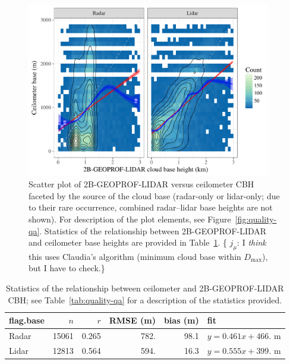 \documentclass[essd,manuscript]{copernicus}\usepackage[]{graphicx}\usepackage[]{color}
\newcommand{\hlnum}[1]{\textcolor[rgb]{0.686,0.059,0.569}{#1}}%
\newenvironment{knitrout}{}{} %
\newcommand\comment[2]{\{\hlnum{ \textit{#1}: #2}\}}
\newcommand\commentjm[1]{\comment{$j_\mu$}{#1}}
\begin{document}
\begin{figure}
  \centering

\begin{knitrout}
\color{fgcolor}

{\centering \includegraphics[width=0.95\textwidth]{figure/method-eval-2bgeoprof-1} 

}



\end{knitrout}
  \caption{Scatter plot of 2B-GEOPROF-LIDAR versus ceilometer CBH
    faceted by the source of the cloud base (radar-only or lidar-only; due to
    their rare occurrence, combined radar--lidar base heights are not shown).
    For description of the plot elements, see Figure~\ref{fig:quality-qa}.  Statistics of the
    relationship between 2B-GEOPROF-LIDAR and ceilometer base heights are provided in
    Table~\ref{tab:2bgeoprof}.
    \commentjm{I \textit{think} this uses Claudia's algorithm (minimum cloud
      base within $D_\text{max}$), but I have to check.}}
  \label{fig:eval-2b}
\end{figure}

\begin{table}
  \caption{Statistics of the relationship between ceilometer and
    2B-GEOPROF-LIDAR CBH; see Table~\ref{tab:quality-qa} for a
    description of the statistics provided.}
  \label{tab:2bgeoprof}
  \centering
\begin{tabular}{lrrrrl}
  \hline
\hline
flag.base & $n$ & $r$ & RMSE (m) & bias (m) & fit \\ 
  \hline
Radar & 15061 & 0.265 & 782. & 98.1 & $y = 0.461 x + 466.$ m \\ 
  Lidar & 12813 & 0.564 & 594. & 16.3 & $y = 0.555 x + 399.$ m \\ 
   \hline
\hline
\end{tabular}

\end{table}
\end{document}

